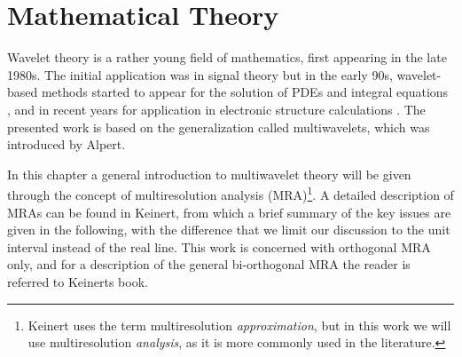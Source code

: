 \chapter{Mathematical Theory}
Wavelet theory is a rather young field of mathematics, first appearing in the
late 1980s. The initial application was in signal theory \cite{Strang} but in
the early 90s, wavelet-based methods started to appear for the solution of
PDEs and integral equations \cite{Beylkin90}\cite{Alpert93}, and in recent 
years for application in electronic structure calculations
\cite{Harrison}\cite{Niklasson}\cite{Arias}. The presented work is based on the
generalization called multiwavelets, which was introduced by Alpert\cite{Alpert}.

In this chapter a general introduction to multiwavelet theory will be given through 
the concept of multiresolution analysis (MRA)\footnote{Keinert\cite{Keinert} uses 
the term multiresolution \emph{approximation}, but in this work we will use
multiresolution \emph{analysis}, as it is more commonly used in the literature.}.
A detailed description of MRAs can be found in Keinert\cite{Keinert}, from which a 
brief summary of the key issues are given in the following, with the difference that 
we limit our discussion to the unit interval instead of the real line. This work is 
concerned with orthogonal MRA only, and for a description of the general bi-orthogonal 
MRA the reader is referred to Keinerts book. 


